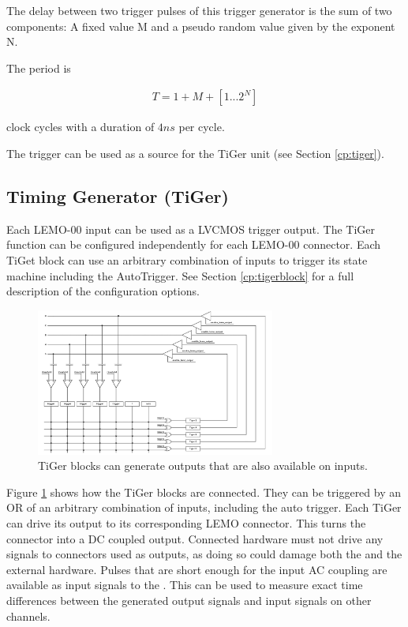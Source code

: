 		The delay between two trigger pulses of this trigger generator is the sum of two components: A fixed value M and a pseudo random value given by the exponent N. \par

		The period is

		\begin{align}
			T = 1 + M + [1...2^N]
		\end{align}

		clock cycles with a duration of $4 ns$ per cycle.\par
		
		The trigger can be used as a source for the TiGer unit (see Section \ref{cp:tiger}).
	
	
	\subsection{Timing Generator (TiGer)\label{cp:tiger}}
		Each LEMO-00 input can be used as a LVCMOS trigger output. The TiGer function can be configured independently for each LEMO-00 connector. 
		Each TiGet block can use an arbitrary combination of inputs to trigger its state machine including the AutoTrigger.
		See Section \ref{cp:tigerblock} for a full description of the configuration options.

		\begin{figure}[ht]
			\begin{center}
				\includegraphics[width=0.7\textwidth]{figures/xTDC4_tiger_matrix.pdf}
				\caption{TiGer blocks can generate outputs that are also available on inputs.\label{fig:matrix}}
			\end{center}
		\end{figure}

		Figure \ref{fig:matrix} shows how the TiGer blocks are connected. They can be triggered by an OR of an arbitrary combination of inputs, 
		including the auto trigger. Each TiGer can drive its output to its corresponding LEMO connector. This turns the connector into a DC coupled output. 
		Connected hardware must not drive any signals to connectors used as outputs, as doing so could damage both the \deviceName and the external hardware.
		Pulses that are short enough for the input AC coupling are available as input signals to the \deviceName. 
		This can be used to measure exact time differences between the generated output signals and input signals on other channels.

